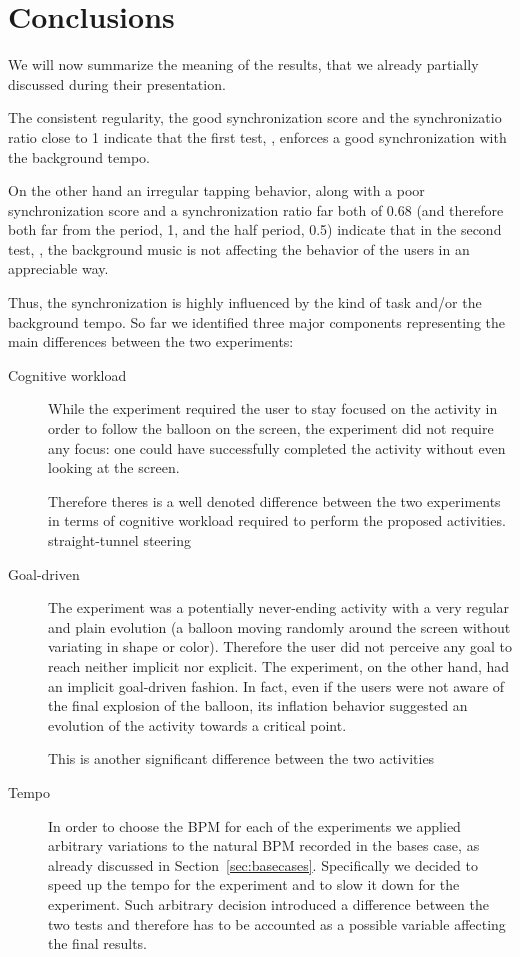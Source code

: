 \section{Conclusions}
\label{sec:conclusions}
We will now summarize the meaning of the results, that we already partially discussed during their presentation.

The consistent regularity, the good synchronization score and the synchronizatio ratio close to 1 indicate that the first test, \testfirst, enforces a good synchronization with the background tempo.

On the other hand an irregular tapping behavior, along with a poor synchronization score and a synchronization ratio far both of 0.68 (and therefore both far from the period, 1, and the half period, 0.5) indicate that in the second test, \testsecond, the background music is not affecting the behavior of the users in an appreciable way.

Thus, the synchronization is highly influenced by the kind of task and/or the background tempo. So far we identified three major components representing the main differences between the two experiments:

\begin{description}
	\item[Cognitive workload] While the \testfirst experiment required the user to stay focused on the activity in order to follow the balloon on the screen, the \testsecond experiment did not require any focus: one could have successfully completed the activity without even looking at the screen.

	Therefore theres is a well denoted difference between the two experiments in terms of cognitive workload required to perform the proposed activities.
straight-tunnel steering
	\item[Goal-driven] The \testfirst experiment was a potentially never-ending activity with a very regular and plain evolution (a balloon moving randomly around the screen without variating in shape or color). Therefore the user did not perceive any goal to reach neither implicit nor explicit. The \testsecond experiment, on the other hand, had an implicit goal-driven fashion. In fact, even if the users were not aware of the final explosion of the balloon, its inflation behavior suggested an evolution of the activity towards a critical point.

	This is another significant difference between the two activities

	\item[Tempo] In order to choose the BPM for each of the experiments we applied arbitrary variations to the natural BPM recorded in the bases case, as already discussed in Section~\ref{sec:basecases}. Specifically we decided to speed up the tempo for the \testfirst experiment and to slow it down for the \testsecond experiment.
	Such arbitrary decision introduced a difference between the two tests and therefore has to be accounted as a possible variable affecting the final results. 
\end{description}

